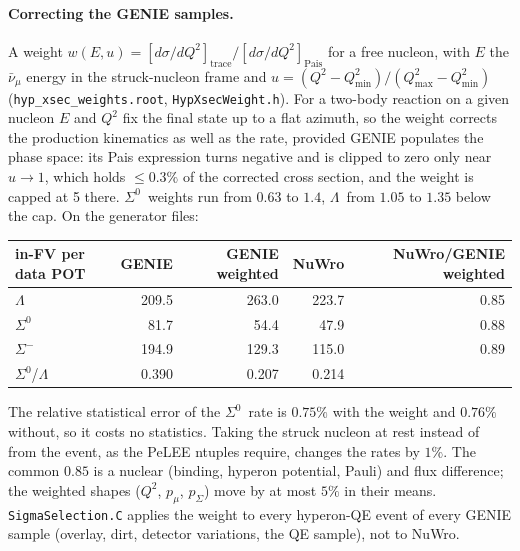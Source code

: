 \documentclass[11pt,a4paper]{article}
\newcommand{\Szero}{\ensuremath{\Sigma^{0}}}
\newcommand{\Lam}{\ensuremath{\Lambda}}
\newcommand{\numubar}{\ensuremath{\bar{\nu}_\mu}}
\begin{document}
\paragraph{Correcting the GENIE samples.} A weight $w(E,u)=\left[d\sigma/dQ^2\right]_
{\mathrm{trace}}/\left[d\sigma/dQ^2\right]_{\mathrm{Pais}}$ for a free nucleon, with
$E$ the $\numubar$ energy in the struck-nucleon frame and
$u=(Q^2-Q^2_{\min})/(Q^2_{\max}-Q^2_{\min})$ (\texttt{hyp\_xsec\_weights.root},
\texttt{HypXsecWeight.h}). For a two-body reaction on a given nucleon $E$ and $Q^2$ fix
the final state up to a flat azimuth, so the weight corrects the production kinematics
as well as the rate, provided GENIE populates the phase space: its Pais expression
turns negative and is clipped to zero only near $u\to1$, which holds $\le0.3\%$ of the
corrected cross section, and the weight is capped at 5 there. \Szero\ weights run from
$0.63$ to $1.4$, \Lam\ from $1.05$ to $1.35$ below the cap. On the generator files:
\begin{center}
\small
\begin{tabular}{lrrrr}
\toprule
in-FV per data POT & GENIE & GENIE weighted & NuWro & NuWro/GENIE weighted \\
\midrule
\Lam\   & 209.5 & 263.0 & 223.7 & 0.85 \\
\Szero\ & 81.7  & 54.4  & 47.9  & 0.88 \\
$\Sigma^-$ & 194.9 & 129.3 & 115.0 & 0.89 \\
\Szero/\Lam & 0.390 & 0.207 & 0.214 & \\
\bottomrule
\end{tabular}
\end{center}
The relative statistical error of the \Szero\ rate is $0.75\%$ with the weight and
$0.76\%$ without, so it costs no statistics. Taking the struck nucleon at rest instead
of from the event, as the PeLEE ntuples require, changes the rates by $1\%$. The common
$0.85$ is a nuclear (binding, hyperon potential, Pauli) and flux difference; the
weighted shapes ($Q^2$, $p_\mu$, $p_\Sigma$) move by at most $5\%$ in their means.
\texttt{SigmaSelection.C} applies the weight to every hyperon-QE event of every GENIE
sample (overlay, dirt, detector variations, the QE sample), not to NuWro.
\end{document}
